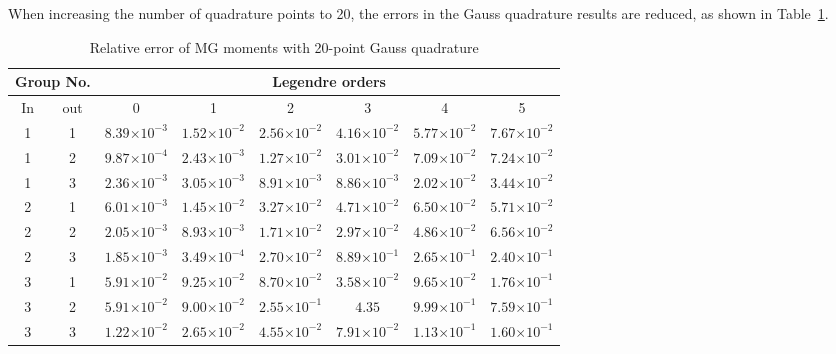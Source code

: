 \documentclass[review]{elsarticle}
\newcommand{\e}[1]{\ensuremath{\times10^{#1}}}
\begin{document}
When increasing the number of quadrature points to 20, the errors in the Gauss quadrature results are reduced, as shown in Table~\ref{tb:20err}.%

\begin{table}[h]
\centering
\caption{Relative error of MG moments with 20-point Gauss quadrature}\normalsize
\label{tb:20err}
\begin{adjustwidth}{-.5cm}{}
\begin{tabular}{|c|c|c|c|c|c|c|c|}
\hline
\multicolumn{2}{|c|}{Group No.} & \multicolumn{6}{c|}{Legendre orders}\\
\hline
In & out & 0 & 1 & 2 & 3 & 4 & 5\\ 
\hline
1 & 1 & \cellcolor{green} $8.39\e{-3}$ & \cellcolor{green} $1.52\e{-2}$ & \cellcolor{green} $2.56\e{-2}$ & \cellcolor{green} $4.16\e{-2}$ & \cellcolor{green} $5.77\e{-2}$ & \cellcolor{green} $7.67\e{-2}$\\
\hline
1 & 2 & \cellcolor{green} $9.87\e{-4}$ & \cellcolor{green} $2.43\e{-3}$ & \cellcolor{green} $1.27\e{-2}$ & \cellcolor{green} $3.01\e{-2}$ & \cellcolor{green} $7.09\e{-2}$ & \cellcolor{green} $7.24\e{-2}$\\
\hline
1 & 3 & \cellcolor{green} $2.36\e{-3}$ & \cellcolor{green} $3.05\e{-3}$ & \cellcolor{green} $8.91\e{-3}$ & \cellcolor{green} $8.86\e{-3}$ & \cellcolor{green} $2.02\e{-2}$ & \cellcolor{green} $3.44\e{-2}$\\
\hline
2 & 1 & \cellcolor{green} $6.01\e{-3}$ & \cellcolor{green} $1.45\e{-2}$ & \cellcolor{green} $3.27\e{-2}$ & \cellcolor{green} $4.71\e{-2}$ & \cellcolor{green} $6.50\e{-2}$ & \cellcolor{green} $5.71\e{-2}$\\
\hline
2 & 2 & \cellcolor{green} $2.05\e{-3}$ & \cellcolor{green} $8.93\e{-3}$ & \cellcolor{green} $1.71\e{-2}$ & \cellcolor{green} $2.97\e{-2}$ & \cellcolor{green} $4.86\e{-2}$ & \cellcolor{green} $6.56\e{-2}$\\
\hline
2 & 3 & \cellcolor{green} $1.85\e{-3}$ & \cellcolor{green} $3.49\e{-4}$ & \cellcolor{green} $2.70\e{-2}$ & \cellcolor{yellow} $8.89\e{-1}$ & \cellcolor{yellow} $2.65\e{-1}$ & \cellcolor{yellow} $2.40\e{-1}$\\
\hline
3 & 1 & \cellcolor{green} $5.91\e{-2}$ & \cellcolor{green} $9.25\e{-2}$ & \cellcolor{green} $8.70\e{-2}$ & \cellcolor{green} $3.58\e{-2}$ & \cellcolor{green} $9.65\e{-2}$ & \cellcolor{cyan} $1.76\e{-1}$\\
\hline
3 & 2 & \cellcolor{green} $5.91\e{-2}$ & \cellcolor{green} $9.00\e{-2}$ & \cellcolor{yellow} $2.55\e{-1}$ & \cellcolor{red} $4.35$ & \cellcolor{yellow} $9.99\e{-1}$ & \cellcolor{yellow} $7.59\e{-1}$\\
\hline
3 & 3 & \cellcolor{green} $1.22\e{-2}$ & \cellcolor{green} $2.65\e{-2}$ & \cellcolor{green} $4.55\e{-2}$ & \cellcolor{green} $7.91\e{-2}$ & \cellcolor{cyan} $1.13\e{-1}$ & \cellcolor{cyan} $1.60\e{-1}$\\
\hline
\end{tabular}
\end{adjustwidth}
\end{table}
\end{document}

